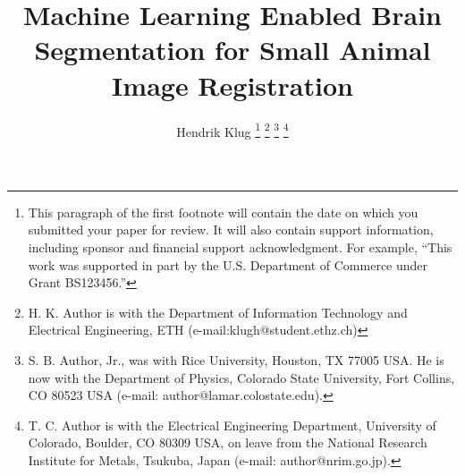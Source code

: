 \documentclass[journal,twoside,web,english]{ieeecolor}
\title{Machine Learning Enabled Brain Segmentation for Small Animal Image Registration}
\author{
	Hendrik Klug
	\newline
\thanks{This paragraph of the first footnote will contain the date on which
you submitted your paper for review. It will also contain support information,
including sponsor and financial support acknowledgment. For example,
``This work was supported in part by the U.S. Department of Commerce under Grant BS123456.'' }
\thanks{H. K. Author is with the Department of Information Technology and Electrical Engineering, ETH (e-mail:klugh@student.ethz.ch)}
\thanks{S. B. Author, Jr., was with Rice University, Houston, TX 77005 USA.
He is now with the Department of Physics, Colorado State University,
Fort Collins, CO 80523 USA (e-mail: author@lamar.colostate.edu).}
\thanks{T. C. Author is with the Electrical Engineering Department,
University of Colorado, Boulder, CO 80309 USA, on leave from the National
Research Institute for Metals, Tsukuba, Japan (e-mail: author@nrim.go.jp).}}
\date{}
\begin{document}
\maketitle
\noindent












\clearpage

%
\end{document}
